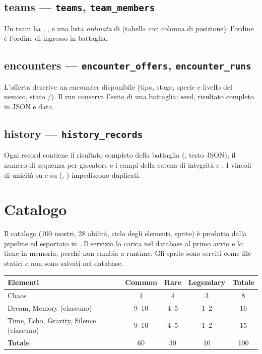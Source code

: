 \documentclass[11pt,a4paper]{report}
\begin{document}
\subsection{teams --- \texttt{teams}, \texttt{team\_members}}
Un team ha , ,  e una lista \emph{ordinata} di  (tabella  con colonna di posizione): l'ordine è l'ordine di ingresso in battaglia.

\subsection{encounters --- \texttt{encounter\_offers}, \texttt{encounter\_runs}}
L'offerta descrive un encounter disponibile (tipo, stage, specie e livello del nemico, stato /). Il run conserva l'esito di una battaglia: seed, risultato completo in JSON e data.

\subsection{history --- \texttt{history\_records}}
Ogni record contiene il risultato completo della battaglia (, testo JSON), il numero di sequenza per giocatore e i campi della catena di integrità  e . I vincoli di unicità su  e su (, ) impediscono duplicati.

\section{Catalogo}

Il catalogo (100 mostri, 28 abilità, ciclo degli elementi, sprite) è prodotto dalla pipeline  ed esportato in . Il servizio lo carica nel database al primo avvio e lo tiene in memoria, perché non cambia a runtime. Gli sprite sono serviti come file statici e non sono salvati nel database.

\begin{center}\small
\begin{tabular}{@{}lccc|c@{}}
\toprule
\textbf{Elementi} & \textbf{Common} & \textbf{Rare} & \textbf{Legendary} & \textbf{Totale} \\
\midrule
Chaos & 1 & 4 & 3 & 8 \\
Dream, Memory (ciascuno) & 9--10 & 4--5 & 1--2 & 16 \\
Time, Echo, Gravity, Silence (ciascuno) & 9--10 & 4--5 & 1--2 & 15 \\
\midrule
\textbf{Totale} & 60 & 30 & 10 & 100 \\
\bottomrule
\end{tabular}
\end{center}
\end{document}
